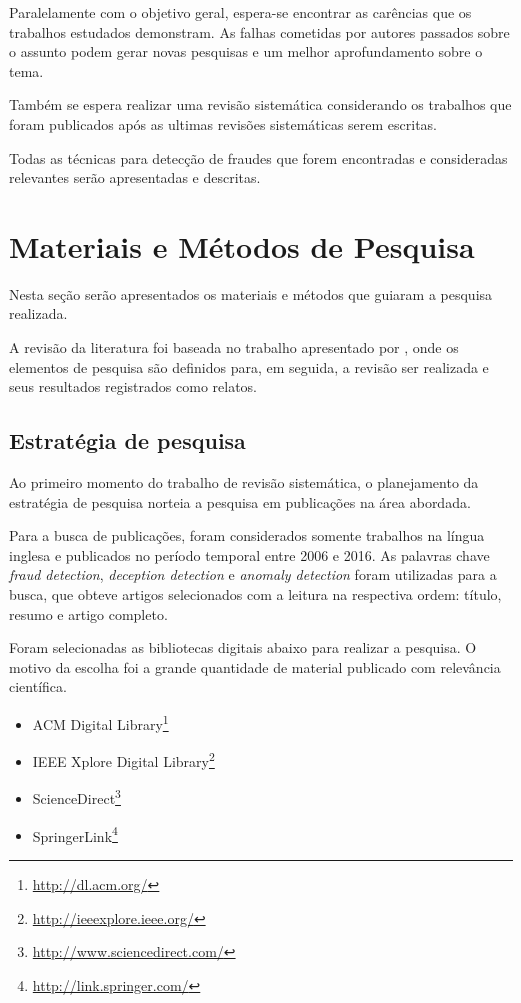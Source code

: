 \documentclass[smallextended]{svjour3}       %
\begin{document}
Paralelamente com o objetivo geral, espera-se encontrar as carências que os trabalhos estudados demonstram. As falhas cometidas por autores passados sobre o assunto podem gerar novas pesquisas e um melhor aprofundamento sobre o tema. 

Também se espera realizar uma revisão sistemática considerando os trabalhos que foram publicados após as ultimas revisões sistemáticas serem escritas.

Todas as técnicas para detecção de fraudes que forem encontradas e consideradas relevantes serão apresentadas e descritas.

\section{Materiais e Métodos de Pesquisa}
\label{sec:1}

Nesta seção serão apresentados os materiais e métodos que guiaram a pesquisa realizada. 

A revisão da literatura foi baseada no trabalho apresentado por \cite{Kitchenham07guidelinesfor}, onde os elementos de pesquisa são definidos para, em seguida, a revisão ser realizada e seus resultados registrados como relatos.

\subsection{Estratégia de pesquisa}
\label{sec:2}

Ao primeiro momento do trabalho de revisão sistemática, o planejamento da estratégia de pesquisa norteia a pesquisa em publicações na área abordada.

Para a busca de publicações, foram considerados somente trabalhos na língua inglesa e publicados no período temporal entre 2006 e 2016. As palavras chave \emph{fraud detection}, \emph{deception detection} e \emph{anomaly detection} foram utilizadas para a busca, que obteve artigos selecionados com a leitura na respectiva ordem: título, resumo e artigo completo. 

Foram selecionadas as bibliotecas digitais abaixo para realizar a pesquisa. O motivo da escolha foi a grande quantidade de material publicado com relevância científica.

\begin{itemize}
	\item \textsf{ACM Digital Library}\footnote{\url{http://dl.acm.org/}}
	
	\item \textsf{IEEE Xplore Digital Library}\footnote{\url{http://ieeexplore.ieee.org/}}
	
	\item \textsf{ScienceDirect}\footnote{\url{http://www.sciencedirect.com/}} 	
	
	\item \textsf{SpringerLink}\footnote{\url{http://link.springer.com/}}
\end{itemize}
\end{document}
